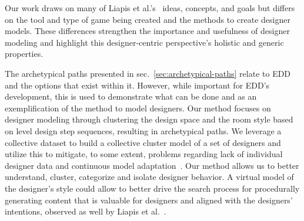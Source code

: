 


Our work draws on many of Liapis et al.'s~ ideas, concepts, and goals but differs on the tool and type of game being created and the methods to create designer models. These differences strengthen the importance and usefulness of designer modeling and highlight this designer-centric perspective's holistic and generic properties.

The archetypical paths presented in sec.~\ref{sec:archetypical-paths} relate to EDD and the options that exist within it. However, while important for EDD's development, this is used to demonstrate what can be done and as an exemplification of the method to model designers. Our method focuses on designer modeling through clustering the design space and the room style based on level design step sequences, resulting in archetypical paths. We leverage a collective dataset to build a collective cluster model of a set of designers and utilize this to mitigate, to some extent, problems regarding lack of individual designer data and continuous model adaptation~. Our method allows us to better understand, cluster, categorize and isolate designer behavior. A virtual model of the designer's style could allow to better drive the search process for procedurally generating content that is valuable for designers and aligned with the designers' intentions, observed as well by Liapis et al.~.



